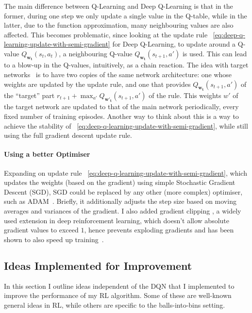The main difference between Q-Learning and Deep Q-Learning is that in the former, during one step we only update a single value in the Q-table, while in the latter, due to the function approximation, many neighbouring values are also affected. This becomes problematic, since looking at the update rule ~\ref{eq:deep-q-learning-update-with-semi-gradient} for Deep Q-Learning, to update around a Q-value $Q_{\mathbf{w_t}}(s_t, a_t)$, a neighbouring Q-value $Q_{\mathbf{w_t}}(s_{t+1}, a')$ is used. This can lead to a blow-up in the Q-values, intuitively, as a chain reaction. The idea with target networks~\cite{argueta1992targetnetwork} is to have two copies of the same network architecture: one whose weights are updated by the update rule, and one that provides $Q_{\mathbf{w_t}}(s_{t+1}, a')$ of the ``target'' part $r_{t+1}+ \max_{a'} Q_{\mathbf{w'_t}}(s_{t+1}, a')$ of the rule. This weights $w'$ of the target network are updated to that of the main network periodically, every fixed number of training episodes. Another way to think about this is a way to achieve the stability of ~\ref{eq:deep-q-learning-update-with-semi-gradient}, while still using the full gradient descent update rule.


\paragraph{Using a better Optimiser}


Expanding on update rule ~\ref{eq:deep-q-learning-update-with-semi-gradient}, which updates the weights (based on the gradient) using simple Stochastic Gradient Descent (SGD), SGD could be replaced by any other (more complex) optimiser, such as ADAM~\cite{kingma2015adamoptimiser}. Briefly, it additionally adjusts the step size based on moving averages and variances of the gradient. I also added gradient clipping \cite{mikolov2012gradientclippingoriginal}, a widely used extension in deep reinforcement learning, which doesn't allow absolute gradient values to exceed $1$, hence prevents exploding gradients and has been shown to also speed up training~\cite{zhang2020gradientclippingaccelerate}.



\subsection{Ideas Implemented for Improvement} \label{improvementideas}


In this section I outline ideas independent of the DQN that I implemented to improve the performance of my RL algorithm. Some of these are well-known general ideas in RL, while others are specific to the \TwoThinning balls-into-bins setting.


